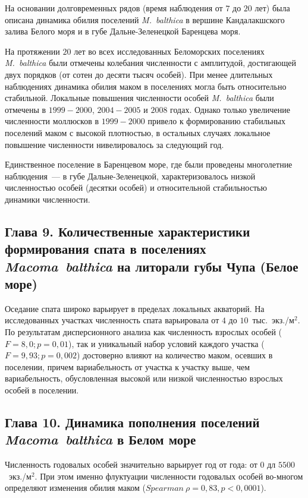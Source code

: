 {На основании долговременных рядов (время наблюдения от $7$ до $20$ лет) была описана динамика обилия поселений \textit{M.~balthica} в вершине Кандалакшского залива Белого моря и в губе Дальне-Зеленецкой Баренцева моря.

На протяжении $20$ лет во всех исследованных Беломорских поселениях \textit{M.~balthica} были отмечены колебания численности с амплитудой, достигающей двух порядков (от сотен до десяти тысяч особей).
При менее длительных наблюдениях динамика обилия маком в поселениях могла быть относительно стабильной.
Локальные повышения численности особей \textit{M.~balthica} были отмечены в $1999-2000$, $2004-2005$ и $2008$ годах.
Однако только увеличение численности моллюсков в $1999-2000$ привело к формированию стабильных поселений маком с высокой плотностью, в остальных случаях локальное повышение численности нивелировалось за следующий год.

Единственное поселение в Баренцевом море, где были проведены многолетние наблюдения~--- в губе Дальне-Зеленецкой, характеризовалось низкой численностью особей (десятки особей) и относительной стабильностью динамики численности. 

\subsection*{Глава 9. Количественные характеристики формирования спата в поселениях \textit{Macoma~balthica} на литорали губы Чупа (Белое море)} 

Оседание спата широко варьирует в пределах локальных акваторий.
На исследованных участках численность спата варьировала от $4$ до $10$~тыс.~экз./м$^2$.
По результатам дисперсионного анализа как численность взрослых особей ($F = 8,0; p = 0,01$), так и уникальный набор условий каждого участка ($F = 9,93; p = 0,002$) достоверно влияют на количество маком, осевших в поселении, причем вариабельность от участка к участку выше, чем вариабельность, обусловленная высокой или низкой численностью взрослых особей в поселении. 

\subsection*{Глава 10. Динамика пополнения поселений \textit{Macoma~balthica} в Белом море}

Численность годовалых особей значительно варьирует год от года: от $0$ дл $5500$~экз./м$^2$.
При этом именно флуктуации численности годовалых особей во-многом определяют изменения обилия маком ($Spearman\ \rho = 0,83, p < 0,0001$).

}
